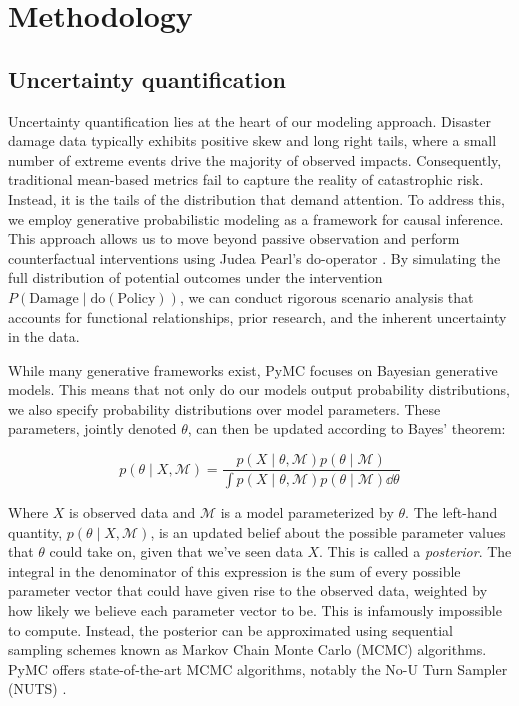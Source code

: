 
\section{Methodology}
\label{sec:methodology}

\subsection{Uncertainty quantification}

Uncertainty quantification lies at the heart of our modeling approach. Disaster damage data typically exhibits positive skew and long right tails, where a small number of extreme events drive the majority of observed impacts. Consequently, traditional mean-based metrics fail to capture the reality of catastrophic risk. Instead, it is the tails of the distribution that demand attention. To address this, we employ generative probabilistic modeling \citep{gelman1995bayesian} as a framework for causal inference. This approach allows us to move beyond passive observation and perform counterfactual interventions using Judea Pearl's do-operator \citep{pearl2009causality}. By simulating the full distribution of potential outcomes under the intervention $P(\text{Damage} \mid \text{do}(\text{Policy}))$, we can conduct rigorous scenario analysis that accounts for functional relationships, prior research, and the inherent uncertainty in the data.

While many generative frameworks exist, PyMC \citep{abril2023pymc} focuses on Bayesian generative models. This means that not only do our models output probability distributions, we also specify probability distributions over model parameters. These parameters, jointly denoted $\theta$, can then be updated according to Bayes' theorem:

\begin{equation}
p(\theta \mid X, \mathcal{M}) = \frac{p(X \mid \theta, \mathcal{M}) p(\theta \mid \mathcal{M})}{\int p(X \mid \theta, \mathcal{M}) p(\theta \mid \mathcal{M}) \dd\theta}
\end{equation}

Where $X$ is observed data and $\mathcal{M}$ is a model parameterized by $\theta$. The left-hand quantity, $p(\theta \mid X, \mathcal{M})$, is an updated belief about the possible parameter values that $\theta$ could take on, given that we've seen data $X$. This is called a \textit{posterior}. The integral in the denominator of this expression is the sum of every possible parameter vector that could have given rise to the observed data, weighted by how likely we believe each parameter vector to be. This is infamously impossible to compute. Instead, the posterior can be approximated using sequential sampling schemes known as Markov Chain Monte Carlo (MCMC) algorithms. PyMC offers state-of-the-art MCMC algorithms, notably the No-U Turn Sampler (NUTS) \citep{hoffman2014no}.

